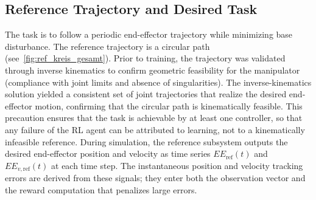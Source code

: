 \documentclass{ieeeaccess}
\begin{document}
\subsection{Reference Trajectory and Desired Task} The task is to follow a periodic end-effector
trajectory while minimizing base disturbance. The reference trajectory is a circular
path (see~\autoref{fig:ref_kreis_gesamt}). Prior to training, the trajectory was validated through inverse kinematics to confirm geometric feasibility for the manipulator (compliance with joint limits and absence of singularities). The inverse-kinematics solution yielded a consistent set of joint trajectories that realize the desired end-effector motion, confirming that the circular path is kinematically feasible.
This precaution ensures that the task is achievable by at least one controller, so that any failure of the RL agent can be attributed to learning, not to a kinematically infeasible reference. During simulation, the reference subsystem outputs the desired end-effector position and velocity
as time series $EE_{\mathrm{ref}}(t)$ and $EE_{v,\mathrm{ref}}(t)$ at each time step. The instantaneous position and velocity tracking errors are derived from these signals; they enter both the observation vector and the reward computation that penalizes large errors.

\end{document}
